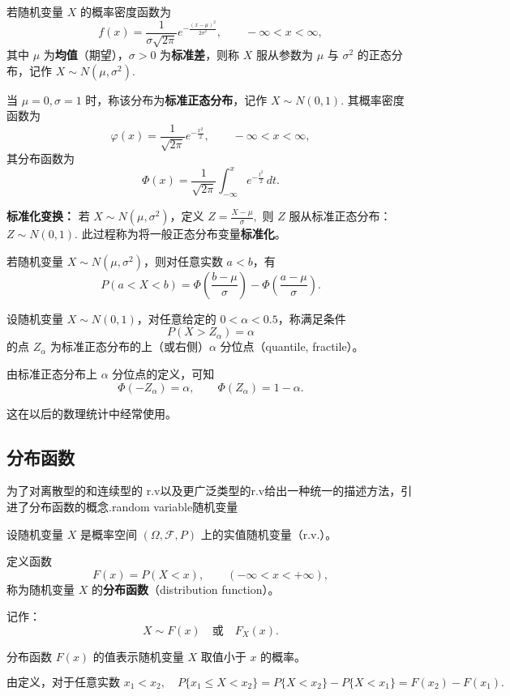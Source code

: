 \begin{definition}[正态分布与标准正态分布]
若随机变量 $X$ 的概率密度函数为
\[
f(x) = \frac{1}{\sigma \sqrt{2\pi}} 
e^{-\frac{(x-\mu)^2}{2\sigma^2}}, \qquad -\infty < x < \infty,
\]
其中 $\mu$ 为\textbf{均值}（期望），$\sigma > 0$ 为\textbf{标准差}，则称 $X$ 服从参数为 $\mu$ 与 $\sigma^2$ 的正态分布，记作
$
X \sim N(\mu, \sigma^2).
$

当 $\mu = 0, \sigma = 1$ 时，称该分布为\textbf{标准正态分布}，记作
$
X \sim N(0,1).
$
其概率密度函数为
\[
\varphi(x) = \frac{1}{\sqrt{2\pi}} e^{-\frac{x^2}{2}}, 
\qquad -\infty < x < \infty,
\]
其分布函数为
\[
\Phi(x) = \frac{1}{\sqrt{2\pi}} 
\int_{-\infty}^{x} e^{-\frac{t^2}{2}}\, dt.
\]

\textbf{标准化变换：}  
若 $X \sim N(\mu, \sigma^2)$，定义
$
Z = \frac{X - \mu}{\sigma},
$
则 $Z$ 服从标准正态分布：
$
Z \sim N(0,1).
$
此过程称为将一般正态分布变量\textbf{标准化}。
\end{definition}
\begin{theorem}
若随机变量 $X \sim N(\mu,\sigma^2)$，则对任意实数 $a<b$，有
\[
P(a<X<b) = \Phi\!\left(\frac{b-\mu}{\sigma}\right) - \Phi\!\left(\frac{a-\mu}{\sigma}\right). \tag{2.1.14}
\]
\end{theorem}
\begin{definition}[标准正态分布的分位点]
设随机变量 $X \sim N(0,1)$，对任意给定的 $0<\alpha<0.5$，称满足条件
\[
P(X > Z_\alpha) = \alpha
\]
的点 $Z_\alpha$ 为标准正态分布的上（或右侧）$\alpha$ 分位点（quantile, fractile）。

由标准正态分布上 $\alpha$ 分位点的定义，可知
\[
\Phi(-Z_\alpha) = \alpha, \qquad \Phi(Z_\alpha) = 1-\alpha.
\]

这在以后的数理统计中经常使用。
\end{definition}
\subsection{分布函数}
为了对离散型的和连续型的 r.v以及更广泛类型的r.v给出一种统一的描述方法，引进了分布函数的概念.random variable随机变量
\begin{definition}[分布函数]
设随机变量 $X$ 是概率空间 $(\Omega, \mathcal{F}, P)$ 上的实值随机变量（r.v.）。

定义函数
\[
F(x) = P(X < x), \qquad (-\infty < x < +\infty),
\]
称为随机变量 $X$ 的\textbf{分布函数}（distribution function）。

记作：
\[
X \sim F(x) \quad \text{或} \quad F_X(x).
\]

分布函数 $F(x)$ 的值表示随机变量 $X$ 取值小于 $x$ 的概率。
\end{definition}
\[
\text{由定义，对于任意实数 } x_1 < x_2, \quad
P\{x_1 \le X < x_2\} = P\{X < x_2\} - P\{X < x_1\}
= F(x_2) - F(x_1).
\]

